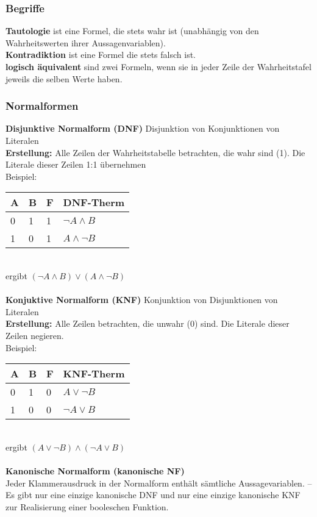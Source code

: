\documentclass[6pt,a4paper]{scrartcl}
\begin{document}
\begin{multicols*}{3}
\subsubsection{Begriffe}
\textbf{Tautologie} ist eine Formel, die stets wahr ist (unabhängig von den Wahrheitswerten ihrer Aussagenvariablen). \\
\textbf{Kontradiktion} ist eine Formel die stets falsch ist. \\
\textbf{logisch äquivalent} sind zwei Formeln, wenn sie in jeder Zeile der Wahrheitstafel jeweils die selben Werte haben. \\

\subsubsection{Normalformen}
\textbf{Disjunktive Normalform (DNF)} Disjunktion von Konjunktionen von Literalen \\
\textbf{Erstellung:} Alle Zeilen der Wahrheitstabelle betrachten, die wahr sind (1). Die Literale dieser Zeilen 1:1 übernehmen \\
Beispiel:
\begin{tabular}{l|l|l|l}
A & B & F & DNF-Therm \\
\hline
0 & 1 & 1 & $\neg A \land B$ \\
1 & 0 & 1 & $A \land \neg B$ \\
\end{tabular} \\
ergibt $(\neg A \land B) \lor (A \land \neg B)$ \\
\\
\textbf{Konjuktive Normalform (KNF)} Konjunktion von Disjunktionen von Literalen\\
\textbf{Erstellung:} Alle Zeilen betrachten, die unwahr (0) sind. Die Literale dieser Zeilen negieren. \\
Beispiel:
\begin{tabular}{l|l|l|l}
A & B & F & KNF-Therm \\
\hline
0 & 1 & 0 & $A \lor \neg B$ \\
1 & 0 & 0 & $\neg A \lor B$ \\
\end{tabular} \\
ergibt $(A \lor \neg B) \land (\neg A \lor B)$ \\
\\
\textbf{Kanonische Normalform (kanonische NF)}\\
Jeder Klammerausdruck in der Normalform enthält sämtliche Aussagevariablen. – Es gibt nur eine einzige
kanonische DNF und nur eine einzige kanonische KNF zur Realisierung einer booleschen Funktion. 



\end{multicols*}
\end{document}
